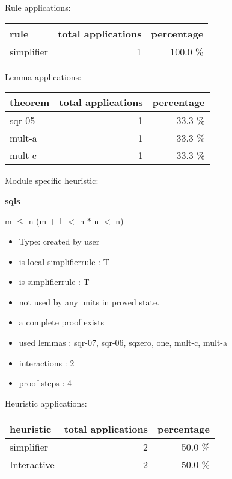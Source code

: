 \documentclass[a4paper]{article}
\begin{document}
Rule applications:

\begin{supertabular}{l|r|r}
rule	        & total applications & percentage \\ \hline
simplifier & 1 & 100.0 \% \\

\end{supertabular}

Lemma applications:

\begin{supertabular}{l|r|r}
theorem	        & total applications & percentage \\ \hline
sqr-05 & 1 & 33.3 \% \\
mult-a & 1 & 33.3 \% \\
mult-c & 1 & 33.3 \% \\

\end{supertabular}

Module specific heuristic:

\pagebreak

{\LARGE\bf sqls}\label{lemma-sqls}

\medskip

 \Fol m $\le$ n \Imp (m + 1 $<$ n $*$ n  $<$ n)

\begin{itemize}

\item Type: created by user

\item is local simplifierrule : T
\item is simplifierrule : T
\item not used by any units in proved state.
\item       a complete proof exists
\item       used lemmas  : sqr-07, sqr-06, sqzero, one, mult-c, mult-a
\item       interactions : 2
\item       proof steps  : 4
\end{itemize}

\medskip


Heuristic applications:

\begin{supertabular}{l|r|r}
heuristic	& total applications & percentage \\ \hline
simplifier & 2 & 50.0 \% \\
Interactive & 2 & 50.0 \% \\

\end{supertabular}
\end{document}
